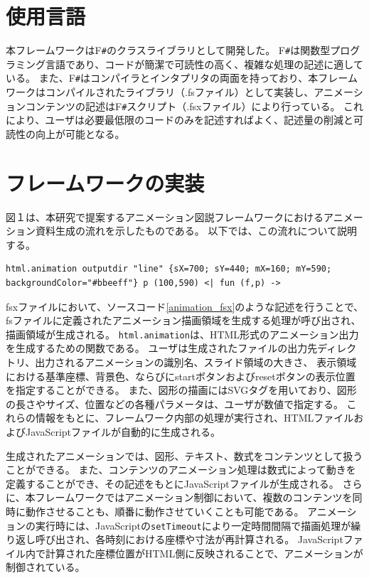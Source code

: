 \documentclass[twocolumn, a4paper]{ltjsarticle}
\begin{document}
\section{使用言語}
本フレームワークはF\texttt{\#}のクラスライブラリとして開発した。
F\texttt{\#}は関数型プログラミング言語であり、コードが簡潔で可読性の高く、複雑な処理の記述に適している。
また、F\texttt{\#}はコンパイラとインタプリタの両面を持っており、本フレームワークはコンパイルされたライブラリ（.fsファイル）として実装し、アニメーションコンテンツの記述はF\texttt{\#}スクリプト（.fsxファイル）により行っている。
これにより、ユーザは必要最低限のコードのみを記述すればよく、記述量の削減と可読性の向上が可能となる。

\section{フレームワークの実装}
図１は、本研究で提案するアニメーション図説フレームワークにおけるアニメーション資料生成の流れを示したものである。
以下では、この流れについて説明する。
\begin{lstlisting}[caption={アニメーション描画領域の生成},label={animation_fsx},breaklines=true,breakatwhitespace=false]
  html.animation outputdir "line" {sX=700; sY=440; mX=160; mY=590; backgroundColor="#bbeeff"} p (100,590) <| fun (f,p) ->
\end{lstlisting}
fsxファイルにおいて、ソースコード\ref{animation_fsx}のような記述を行うことで、fsファイルに定義されたアニメーション描画領域を生成する処理が呼び出され、描画領域が生成される。
\texttt{html.animation}は、HTML形式のアニメーション出力を生成するための関数である。
ユーザは生成されたファイルの出力先ディレクトリ、出力されるアニメーションの識別名、スライド領域の大きさ、
表示領域における基準座標、背景色、ならびにstartボタンおよびresetボタンの表示位置を指定することができる。
また、図形の描画にはSVGタグを用いており、図形の長さやサイズ、位置などの各種パラメータは、ユーザが数値で指定する。
これらの情報をもとに、フレームワーク内部の処理が実行され、HTMLファイルおよびJavaScriptファイルが自動的に生成される。
\par
生成されたアニメーションでは、図形、テキスト、数式をコンテンツとして扱うことができる。
また、コンテンツのアニメーション処理は数式によって動きを定義することができ、その記述をもとにJavaScriptファイルが生成される。
さらに、本フレームワークではアニメーション制御において、複数のコンテンツを同時に動作させることも、順番に動作させていくことも可能である。
アニメーションの実行時には、JavaScriptの\texttt{setTimeout}により一定時間間隔で描画処理が繰り返し呼び出され、各時刻における座標や寸法が再計算される。
JavaScriptファイル内で計算された座標位置がHTML側に反映されることで、アニメーションが制御されている。
\end{document}

